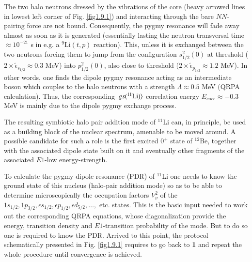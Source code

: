 The two halo neutrons dressed by the vibrations of the core (heavy arrowed lines in lowest left corner of Fig. \ref{fig1.9.1}) and interacting through the bare $NN$-pairing force are not bound. Consequently, the pygmy resonance will fade away almost as soon as it is generated (essentially lasting the neutron transversal time $\approx 10^{-21}$ s in e.g. a $^9$Li$(t,p)$ reaction). This, unless it is exchanged between the two neutrons forcing them to jump from the configuration $s^{2}_{1/2}(0)$ at threshold ($2\times\tilde\epsilon_{s_{1/2}}\approx 0.3$ MeV) into  $p^2_{1/2}(0)$, also close to threshold     ($2\times\tilde\epsilon_{p_{1/2}}\approx 1.2$ MeV). In other words, one finds the dipole pygmy resonance acting as an intermediate boson which  couples to the halo neutrons with a  strength $\Lambda\approx 0.5$ MeV (QRPA calculation). Thus, the corresponding $|{gs(^{11}\text{Li})} \rangle$ correlation energy $E_{corr}\approx-0.3$ MeV is mainly due to the dipole pygmy exchange process.


 The resulting symbiotic halo pair addition mode of $^{11}$Li can, in principle, be used as a building block of the nuclear spectrum, amenable to  be moved around. A possible candidate for such a role is the first excited $0^+$ state of $^{12}$Be, together with the associated dipole state built on it and eventually other fragments of the associated $E1$-low energy-strength.


 To calculate the pygmy dipole  resonance (PDR) of $^{11}$Li one needs to know the ground state of this nucleus (halo-pair addition mode) so as to be able to determine microscopically the occupation factors $V_\nu^2$ of the $1s_{1/2},1p_{3/2},\epsilon s_{1/2},\epsilon p_{1/2},\epsilon d_{5/2},\dots,$ etc. states.  This is the basic input needed to work out the corresponding QRPA equations, whose diagonalization provide the energy, transition density and $E1$-transition probability of the mode. But to do so one is required to know the PDR. Arrived to this point, the protocol schematically presented in Fig. \ref{fig1.9.1}  requires to  go back to \textbf{1} and repeat the whole procedure until   convergence is achieved. 

